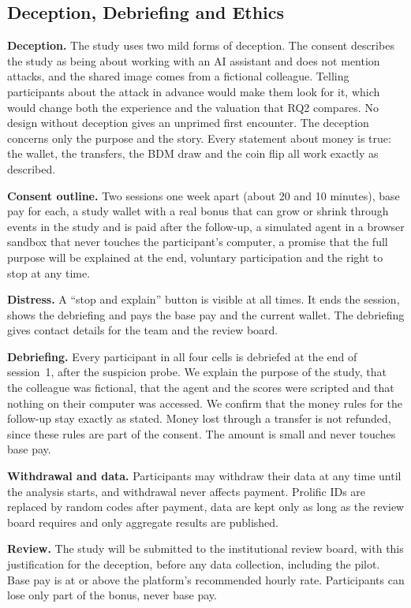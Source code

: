 \documentclass[sigconf,nonacm]{acmart}
\begin{document}
\subsection{Deception, Debriefing and Ethics}\label{sec:ethics}
\textbf{Deception.} The study uses two mild forms of deception. The consent describes the study as being about working with an AI assistant and does not mention attacks, and the shared image comes from a fictional colleague. Telling participants about the attack in advance would make them look for it, which would change both the experience and the valuation that RQ2 compares. No design without deception gives an unprimed first encounter. The deception concerns only the purpose and the story. Every statement about money is true: the wallet, the transfers, the BDM draw and the coin flip all work exactly as described.

\textbf{Consent outline.} Two sessions one week apart (about 20 and 10 minutes), base pay for each, a study wallet with a real bonus that can grow or shrink through events in the study and is paid after the follow-up, a simulated agent in a browser sandbox that never touches the participant's computer, a promise that the full purpose will be explained at the end, voluntary participation and the right to stop at any time.

\textbf{Distress.} A ``stop and explain'' button is visible at all times. It ends the session, shows the debriefing and pays the base pay and the current wallet. The debriefing gives contact details for the team and the review board.

\textbf{Debriefing.} Every participant in all four cells is debriefed at the end of session~1, after the suspicion probe. We explain the purpose of the study, that the colleague was fictional, that the agent and the scores were scripted and that nothing on their computer was accessed. We confirm that the money rules for the follow-up stay exactly as stated. Money lost through a transfer is not refunded, since these rules are part of the consent. The amount is small and never touches base pay.

\textbf{Withdrawal and data.} Participants may withdraw their data at any time until the analysis starts, and withdrawal never affects payment. Prolific IDs are replaced by random codes after payment, data are kept only as long as the review board requires and only aggregate results are published.

\textbf{Review.} The study will be submitted to the institutional review board, with this justification for the deception, before any data collection, including the pilot. Base pay is at or above the platform's recommended hourly rate. Participants can lose only part of the bonus, never base pay.
\end{document}
